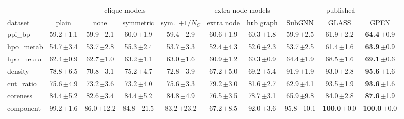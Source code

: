 \documentclass[11pt]{article}
\begin{document}
\begin{table}[H]
\centering
\footnotesize
\setlength{\tabcolsep}{3pt}
\begin{tabular}{lcccc|cc|ccc}
\toprule
 & \multicolumn{4}{c|}{clique models} & \multicolumn{2}{c|}{extra-node models} & \multicolumn{3}{c}{published} \\
dataset & plain & none & symmetric & sym.\ $+1/N_C$ & extra node & hub graph & SubGNN & GLASS & GPEN \\
\midrule
ppi\_bp    & 59.2\,{\scriptsize$\pm$1.1} & 59.9\,{\scriptsize$\pm$2.1} & 60.0\,{\scriptsize$\pm$1.9} & 59.4\,{\scriptsize$\pm$2.9} & 60.6\,{\scriptsize$\pm$1.9} & 60.3\,{\scriptsize$\pm$1.8} & 59.9\,{\scriptsize$\pm$2.5} & 61.9\,{\scriptsize$\pm$2.2} & \textbf{64.4}\,{\scriptsize$\pm$0.9} \\
hpo\_metab & 54.7\,{\scriptsize$\pm$3.4} & 53.7\,{\scriptsize$\pm$2.8} & 55.3\,{\scriptsize$\pm$2.4} & 53.7\,{\scriptsize$\pm$3.3} & 52.4\,{\scriptsize$\pm$4.3} & 52.6\,{\scriptsize$\pm$2.3} & 53.7\,{\scriptsize$\pm$2.5} & 61.4\,{\scriptsize$\pm$1.6} & \textbf{63.9}\,{\scriptsize$\pm$0.9} \\
hpo\_neuro & 62.4\,{\scriptsize$\pm$0.9} & 62.7\,{\scriptsize$\pm$1.0} & 63.2\,{\scriptsize$\pm$1.1} & 63.0\,{\scriptsize$\pm$1.6} & 60.9\,{\scriptsize$\pm$1.2} & 60.3\,{\scriptsize$\pm$0.9} & 64.4\,{\scriptsize$\pm$1.9} & 68.5\,{\scriptsize$\pm$1.6} & \textbf{69.1}\,{\scriptsize$\pm$0.6} \\
density    & 78.8\,{\scriptsize$\pm$6.5} & 70.8\,{\scriptsize$\pm$3.1} & 75.2\,{\scriptsize$\pm$4.7} & 72.8\,{\scriptsize$\pm$3.9} & 67.2\,{\scriptsize$\pm$5.0} & 69.2\,{\scriptsize$\pm$5.4} & 91.9\,{\scriptsize$\pm$1.9} & 93.0\,{\scriptsize$\pm$2.8} & \textbf{95.6}\,{\scriptsize$\pm$1.6} \\
cut\_ratio & 75.6\,{\scriptsize$\pm$4.9} & 73.2\,{\scriptsize$\pm$3.6} & 73.2\,{\scriptsize$\pm$4.0} & 75.6\,{\scriptsize$\pm$3.3} & 79.2\,{\scriptsize$\pm$3.0} & 81.6\,{\scriptsize$\pm$2.7} & 62.9\,{\scriptsize$\pm$4.1} & 93.5\,{\scriptsize$\pm$1.9} & \textbf{93.6}\,{\scriptsize$\pm$1.6} \\
coreness   & 84.4\,{\scriptsize$\pm$5.2} & 82.6\,{\scriptsize$\pm$3.4} & 84.4\,{\scriptsize$\pm$5.2} & 84.8\,{\scriptsize$\pm$4.9} & 76.5\,{\scriptsize$\pm$3.5} & 78.7\,{\scriptsize$\pm$3.1} & 65.9\,{\scriptsize$\pm$9.8} & 84.0\,{\scriptsize$\pm$2.8} & \textbf{87.6}\,{\scriptsize$\pm$1.9} \\
component  & 99.2\,{\scriptsize$\pm$1.6} & 86.0\,{\scriptsize$\pm$12.2} & 84.8\,{\scriptsize$\pm$21.5} & 83.2\,{\scriptsize$\pm$23.2} & 67.2\,{\scriptsize$\pm$8.5} & 92.0\,{\scriptsize$\pm$3.6} & 95.8\,{\scriptsize$\pm$10.1} & \textbf{100.0}\,{\scriptsize$\pm$0.0} & \textbf{100.0}\,{\scriptsize$\pm$0.0} \\

\end{tabular}
\end{table}
\end{document}
